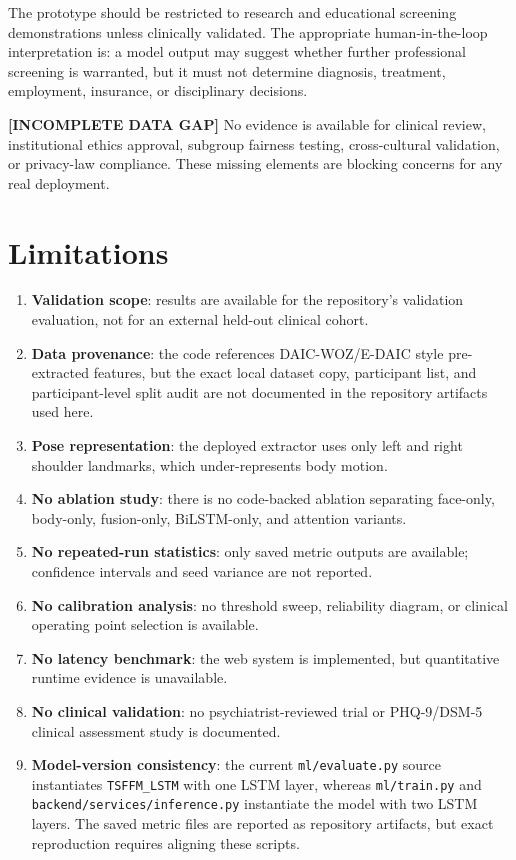 \documentclass[conference]{IEEEtran}
\newcommand{\gap}{\textbf{[INCOMPLETE DATA GAP]}}
\begin{document}
The prototype should be restricted to research and educational screening demonstrations unless clinically validated. The appropriate human-in-the-loop interpretation is: a model output may suggest whether further professional screening is warranted, but it must not determine diagnosis, treatment, employment, insurance, or disciplinary decisions.

\gap{} No evidence is available for clinical review, institutional ethics approval, subgroup fairness testing, cross-cultural validation, or privacy-law compliance. These missing elements are blocking concerns for any real deployment.

\section{Limitations}
\begin{enumerate}
\item \textbf{Validation scope}: results are available for the repository's validation evaluation, not for an external held-out clinical cohort.
\item \textbf{Data provenance}: the code references DAIC-WOZ/E-DAIC style pre-extracted features, but the exact local dataset copy, participant list, and participant-level split audit are not documented in the repository artifacts used here.
\item \textbf{Pose representation}: the deployed extractor uses only left and right shoulder landmarks, which under-represents body motion.
\item \textbf{No ablation study}: there is no code-backed ablation separating face-only, body-only, fusion-only, BiLSTM-only, and attention variants.
\item \textbf{No repeated-run statistics}: only saved metric outputs are available; confidence intervals and seed variance are not reported.
\item \textbf{No calibration analysis}: no threshold sweep, reliability diagram, or clinical operating point selection is available.
\item \textbf{No latency benchmark}: the web system is implemented, but quantitative runtime evidence is unavailable.
\item \textbf{No clinical validation}: no psychiatrist-reviewed trial or PHQ-9/DSM-5 clinical assessment study is documented.
\item \textbf{Model-version consistency}: the current \texttt{ml/evaluate.py} source instantiates \texttt{TSFFM\_LSTM} with one LSTM layer, whereas \texttt{ml/train.py} and \texttt{backend/services/inference.py} instantiate the model with two LSTM layers. The saved metric files are reported as repository artifacts, but exact reproduction requires aligning these scripts.
\end{enumerate}
\end{document}
